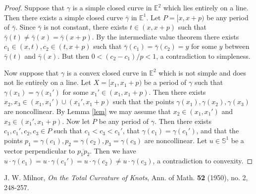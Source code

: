 \documentclass{amsart}
\theoremstyle{definition}
\begin{document}
\begin{proof}
    \newcommand{\gb}{\bar{\gamma}}
    Suppose that $\gamma$ is a simple closed curve in $\mathbb{E}^2$
    which lies entirely on a line. Then there exists a simple closed
    curve $\gb$ in $\mathbb{E}^1$.
    Let $P=[x,x+p)$ be any period of $\gb$. Since $\gb$ is not constant,
    there exists $t\in(x,x+p)$ such that $\gb(t)\ne\gb(x)=\gb(x+p)$.
    By the intermediate value theorem there exists $c_1\in(x,t),
        c_2\in(t,x+p)$ such that $\gb(c_1)=\gb(c_2)=y$ for some
    $y$ between $\gb(t)$ and $\gb(x)$. But then $0<(c_2-c_1)/p<1$,
    a contradiction to simpleness.

    Now suppose that $\gamma$ is a convex closed curve in $\mathbb{E}^2$
    which is not simple and does not lie entirely on a line.
    Let $X=[x_1,x_1+p)$ be a period of $\gamma$ such that
    $\gamma(x_1)=\gamma(x_1')$ for some $x_1'\in(x_1,x_1+p)$.
    Then there exists $x_2,x_3\in(x_1,x_1')\cup(x_1',x_1+p)$
    such that the points $\gamma(x_1),\gamma(x_2),\gamma(x_3)$ are
    noncollinear. By Lemma \ref{lem} we may assume that
    $x_2\in(x_1,x_1')$ and $x_3\in(x_1',x_1+p)$.
    Now let $P$ be any period of $\gamma$. Then there exists
    $c_1,c_1',c_2,c_3\in P$ such that $c_1<c_3<c_1'$,
    that $\gamma(c_1)=\gamma(c_1')$, and that the points
    $p_1=\gamma(c_1),p_2=\gamma(c_2),p_3=\gamma(c_3)$ are noncollinear.
    Let $u\in\mathbb{S}^1$ be a vector perpendicular to
    $\overline{p_1p_2}$. Then we have
    $u\cdot\gamma(c_1)=u\cdot\gamma(c_1')=u\cdot\gamma(c_2)
        \ne u\cdot\gamma(c_3)$, a contradiction to convexity.
\end{proof}

\begin{thebibliography}{9}

    J. W. Milnor,
    \emph{On the Total Curvature of Knots},
    Ann. of Math.
    \textbf{52} (1950), no. 2, 248-257.

\end{thebibliography}
\end{document}
